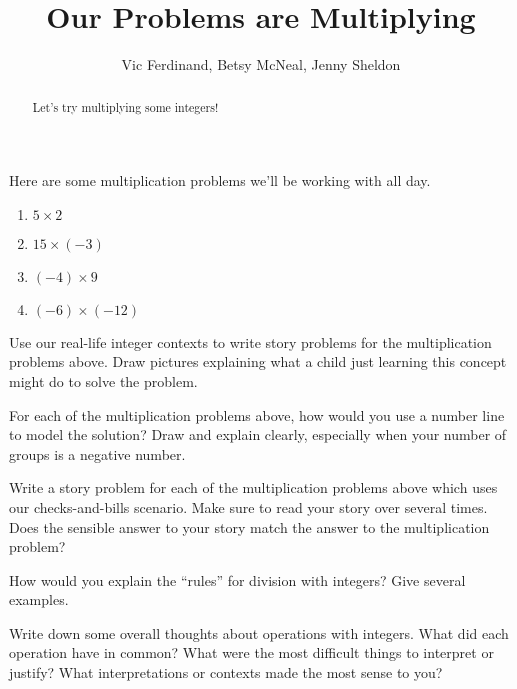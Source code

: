 \documentclass{ximera}
\title{Our Problems are Multiplying}
\author{Vic Ferdinand, Betsy McNeal, Jenny Sheldon}
\begin{document}
\begin{abstract}
    Let's try multiplying some integers!
\end{abstract}
\maketitle



Here are some multiplication problems we'll be working with all day.

\begin{enumerate}
    \item $5 \times 2$
    \item $15 \times (-3)$
    \item $(-4) \times 9$
    \item $(-6) \times (-12)$
\end{enumerate}


\begin{problem}
Use our real-life integer contexts to write story problems for the multiplication problems above.  Draw pictures explaining what a child just learning this concept might do to solve the problem.

\end{problem}

\begin{problem}
For each of the multiplication problems above, how would you use a number line to model the solution?  Draw and explain clearly, especially when your number of groups is a negative number.
\end{problem}

\begin{problem}
Write a story problem for each of the multiplication problems above which uses our checks-and-bills scenario.  Make sure to read your story over several times.  Does the sensible answer to your story match the answer to the multiplication problem?
\end{problem}

\begin{problem}
How would you explain the ``rules'' for division with integers?  Give several examples.


\end{problem}


\begin{problem}
Write down some overall thoughts about operations with integers.  What did each operation have in common?  What were the most difficult things to interpret or justify?  What interpretations or contexts made the most sense to you?


\end{problem}
\end{document}
